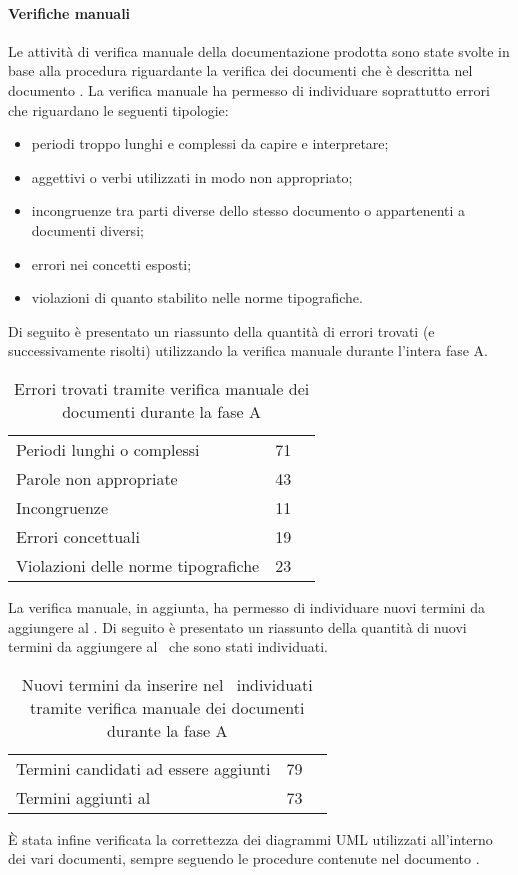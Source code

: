 \documentclass[../PianoDiQualifica.tex]{subfiles}
\begin{document}
\begin{appendices}
			\paragraph{Verifiche manuali}
			Le attività di verifica manuale della documentazione prodotta sono state svolte in base alla procedura riguardante la verifica dei documenti che è descritta nel documento \normediprogettov. La verifica manuale ha permesso di individuare soprattutto errori che riguardano le seguenti tipologie:
			\begin{itemize}
				\item periodi troppo lunghi e complessi da capire e interpretare;
				\item aggettivi o verbi utilizzati in modo non appropriato;
				\item incongruenze tra parti diverse dello stesso documento o appartenenti a documenti diversi;
				\item errori nei concetti esposti;
				\item violazioni di quanto stabilito nelle norme tipografiche.
			\end{itemize}
			Di seguito è presentato un riassunto della quantità di errori trovati (e successivamente risolti) utilizzando la verifica manuale durante l'intera fase A.
\begin{table}[H]
		\centering
		\begin{tabular}{l * {2}{c}}
			\midrule
			Periodi lunghi o complessi &	71 \\
			Parole non appropriate & 43 \\
			Incongruenze & 11 \\
			Errori concettuali & 19 \\
			Violazioni delle norme tipografiche & 23 \\
			\midrule
		\end{tabular}
		\caption{Errori trovati tramite verifica manuale dei documenti durante la fase A}
		\label{tab:errori_manuale}
\end{table}
			La verifica manuale, in aggiunta, ha permesso di individuare nuovi termini da aggiungere al \glossario. Di seguito è presentato un riassunto della quantità di nuovi termini da aggiungere al \glossario\ che sono stati individuati.
\begin{table}[H]
		\centering
		\begin{tabular}{l * {2}{c}}
			\midrule
			Termini candidati ad essere aggiunti &	79 \\
			Termini aggiunti al \glossario & 73 \\
			\midrule
		\end{tabular}
		\caption{Nuovi termini da inserire nel \glossario\ individuati tramite verifica manuale dei documenti durante la fase A}
		\label{tab:termini_glossario}
\end{table}	
			È stata infine verificata la correttezza dei diagrammi UML utilizzati all'interno dei vari documenti, sempre seguendo le procedure contenute nel documento \normediprogettov.

\end{appendices}
\end{document}
